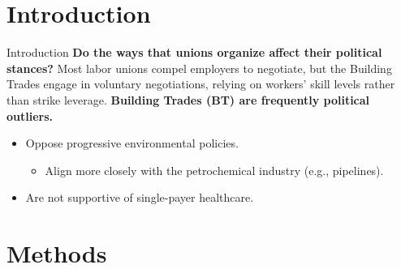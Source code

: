 \documentclass{beamer}
\begin{document}
\section{Introduction}
\begin{frame}{Introduction}
\textbf{Do the ways that unions organize affect their political stances?}\newline\newline %
Most labor unions compel employers to negotiate, but the Building Trades engage in voluntary negotiations, relying on workers' skill levels rather than strike leverage. 
	\newline\newline
	\textbf{Building Trades (BT) are frequently political outliers.}
	\begin{itemize}
		\item Oppose progressive environmental policies.
		\begin{itemize}
			\item Align more closely with the petrochemical industry (e.g., pipelines).
		\end{itemize}
		\item Are not supportive of single-payer healthcare.
	\end{itemize}
	
\end{frame}

\section{Methods}
\end{document}
